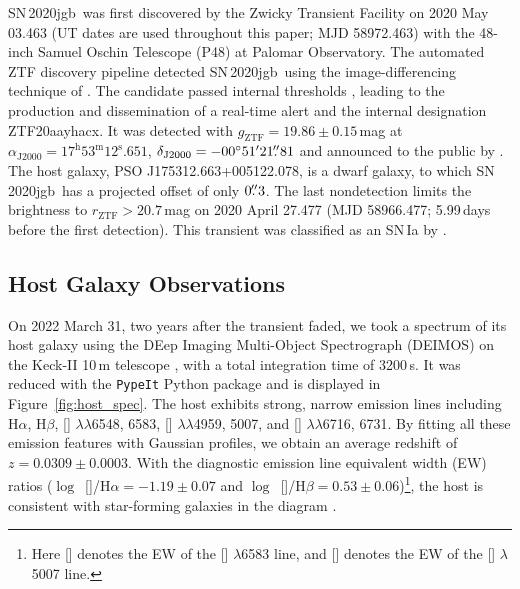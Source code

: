 \documentclass[twocolumn]{aastex631}
\newcommand{\sn}{SN\,2020jgb}
\begin{document}
\sn\ was first discovered by the Zwicky Transient Facility \citep[ZTF;][]{ZTF2019a,ZTF2019b} on 2020 May 03.463 (UT dates are used throughout this paper; MJD 58972.463) with the 48-inch Samuel Oschin Telescope (P48) at Palomar Observatory. The automated ZTF discovery pipeline \citep{Masci_2019} detected \sn\ using the image-differencing technique of \citet{Zackay_imagesub_2016}. The candidate passed internal thresholds \citep[e.g.,][]{Mahabal_ZTFML_2019, Duev_ZTFML_2019}, leading to the production and dissemination of a real-time alert \citep{Patterson_ZTFalert_2019} and the internal designation ZTF20aayhacx. It was detected with $g_\mathrm{ZTF} = 19.86 \pm 0.15\,$mag at $\alpha_\mathrm{J2000}=17^\mathrm{h}53^\mathrm{m}12^\mathrm{s}.651$, $\delta_\mathrm{J2000}=-00^\circ51'21\mbox{$.\!\!^{\prime\prime}$}{81}$ and announced to the public by \citet{Fremling_report_2020}. The host galaxy, PSO J175312.663+005122.078, is a dwarf galaxy, to which \sn\ has a projected offset of only $0\mbox{$.\!\!^{\prime\prime}$}3$. The last nondetection limits the brightness to $r_\mathrm{ZTF} > 20.7$\,mag on 2020 April 27.477 (MJD 58966.477; 5.99\,days before the first detection). This transient was classified as an SN\,Ia by \citet{TNS_2020}.

\subsection{Host Galaxy Observations}
On 2022 March 31, two years after the transient faded, we took a spectrum of its host galaxy using the DEep Imaging Multi-Object Spectrograph (DEIMOS) on the Keck-II 10\,m telescope \citep{DEIMOS_2003}, with a total integration time of 3200\,s. It was reduced with the \texttt{PypeIt} Python package \citep{pypeit:joss_pub} and is displayed in Figure~\ref{fig:host_spec}. 
The host exhibits strong, narrow emission lines including H$\alpha$, H$\beta$, [] $\lambda\lambda$6548, 6583, [] $\lambda\lambda$4959, 5007, and [] $\lambda\lambda$6716, 6731. By fitting all these emission features with Gaussian profiles, we obtain an average redshift of $z=0.0309\pm0.0003$. With the diagnostic emission line equivalent width (EW) ratios ($\log$~[]/H$\alpha=-1.19\pm0.07$ and $\log$~[]/H$\beta=0.53\pm0.06$)\footnote{Here [] denotes the EW of the [] $\lambda$6583 line, and [] denotes the EW of the [] $\lambda$5007 line.}, the host is consistent with star-forming galaxies in the \citet[][hereafter BPT]{BPT_1981} diagram \citep[see also][]{Veilleux_1987}. 
\end{document}
